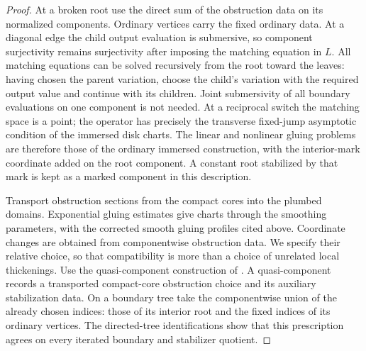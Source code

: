 \documentclass[11pt]{article}
\numberwithin{equation}{section}
\theoremstyle{definition}
\theoremstyle{remark}
\begin{document}
\begin{proof}
At a broken root use the direct sum of the obstruction data on its
normalized components.  Ordinary vertices carry the fixed ordinary
data.  At a diagonal edge the child output evaluation is submersive,
so component surjectivity remains surjectivity after imposing the
matching equation in $L$.  All matching equations can be solved
recursively from the root toward the leaves: having chosen the
parent variation, choose the child's variation with the required
output value and continue with its children.  Joint submersivity
of all boundary evaluations on one component is not needed.
At a reciprocal switch the matching
space is a point; the operator has precisely the transverse
fixed-jump asymptotic condition of the immersed disk charts.
The linear and nonlinear gluing problems are therefore those of
the ordinary immersed construction, with the interior-mark
coordinate added on the root component.  A constant root
stabilized by that mark is kept as a marked component in this
description.

Transport obstruction sections from the compact cores into the
plumbed domains.  Exponential gluing estimates give charts through
the smoothing parameters, with the corrected smooth gluing
profiles cited above.  Coordinate changes are obtained from
componentwise obstruction data.  We specify their relative choice,
so that compatibility is more than a choice of unrelated local
thickenings.  Use the quasi-component construction of
\cite[Conditions~8.12--8.15, Lemmas~8.19--8.20, and
Definition~8.21]{Floer:DisksII}.  A quasi-component records a
transported compact-core obstruction choice and its auxiliary
stabilization data.  On a boundary tree take the componentwise
union of the already chosen indices: those of its interior root
and the fixed indices of its ordinary vertices.  The directed-tree
identifications show that this prescription agrees on every
iterated boundary and stabilizer quotient.


\end{proof}
\end{document}
